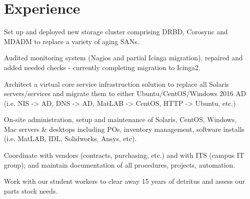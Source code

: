 \documentclass[letterpaper]{deedy-resume} %
\begin{document}
\begin{minipage}[t]{0.66\textwidth} %


\section{Experience}


\vspace{\topsep} %
\begin{tightitemize}
\item Set up and deployed new storage cluster comprising DRBD, Corosync and MDADM to replace a variety of aging SANs.
\item Audited monitoring system (Nagios and partial Icinga migration), repaired and added needed checks - currently completing migration to Icinga2.
\item Architect a virtual core service infrastruction solution to replace all Solaris servers/services and migrate them to either Ubuntu/CentOS/Windows 2016 AD (i.e. NIS -> AD, DNS -> AD, MatLAB -> CentOS, HTTP -> Ubuntu, etc.)
\item On-site administration, setup and maintenance of Solaris, CentOS, Windows, Mac servers \& desktops including POs,  inventory management, software installs (i.e. MatLAB, IDL, Solidworks, Ansys, etc).
\item Coordinate with vendors (contracts, purchasing, etc.) and with ITS (campus IT group); and maintain documentation of all procedures, projects, automation.
\item Work with our student workers to clear away 15 years of detritus and assess our parts stock needs.
\end{tightitemize}





\end{minipage}
\end{document}
